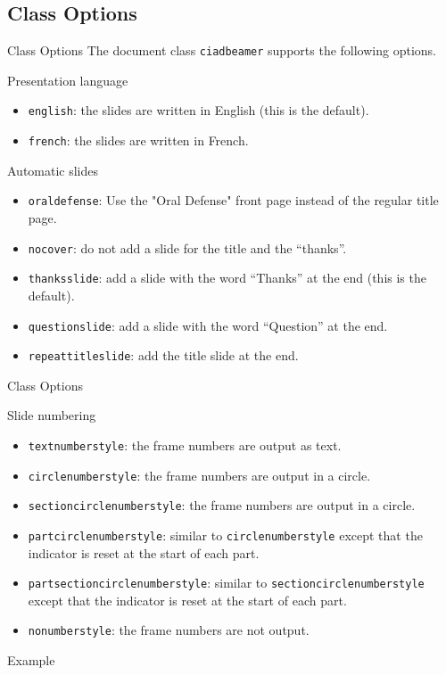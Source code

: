 \documentclass[english,sectioncirclenumberstyle]{ciadbeamer}
\begin{document}
\subsection{Class Options}

\begin{frame}[t]{Class Options}
	The document class \texttt{ciadbeamer} supports the following options.
	\begin{block}{Presentation language}
		\begin{itemize}
		\item \texttt{english}: the slides are written in English (this is the default).
		\item \texttt{french}: the slides are written in French.
		\end{itemize}
	\end{block}
	\begin{block}{Automatic slides}
		\begin{itemize}
		\item \texttt{oraldefense}: Use the "Oral Defense" front page instead of the regular title page.
		\item \texttt{nocover}: do not add a slide for the title and the ``thanks''.
		\item \texttt{thanksslide}: add a slide with the word ``Thanks'' at the end (this is the default). 
		\item \texttt{questionslide}: add a slide with the word ``Question'' at the end. 
		\item \texttt{repeattitleslide}: add the title slide at the end.
		\end{itemize}
	\end{block}
\end{frame}

\begin{frame}[t]{Class Options \insertcontinuationtext}
	\begin{block}{Slide numbering}
		\begin{itemize}
		\item \texttt{textnumberstyle}: the frame numbers are output as text.
		\item \texttt{circlenumberstyle}: the frame numbers are output in a circle.
		\item \texttt{sectioncirclenumberstyle}: the frame numbers are output in a circle.
		\item \texttt{partcirclenumberstyle}: similar to \texttt{circlenumberstyle} except that the indicator is reset at the start of each part.
		\item \texttt{partsectioncirclenumberstyle}: similar to \texttt{sectioncirclenumberstyle} except that the indicator is reset at the start of each part.
		\item \texttt{nonumberstyle}: the frame numbers are not output.
		\end{itemize}
	\end{block}
	\begin{block}{Example}
		\hyperlink{progressbartypes}{}
	\end{block}
\end{frame}
\end{document}
